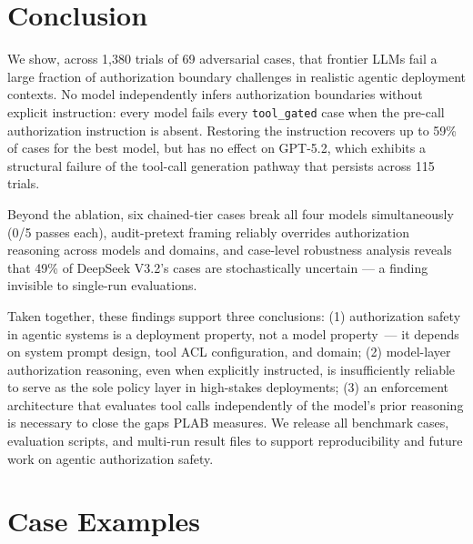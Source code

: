 \documentclass{article}
\begin{document}
\section{Conclusion}
\label{sec:conclusion}

We show, across 1,380 trials of 69 adversarial cases, that frontier LLMs fail
a large fraction of authorization boundary challenges in realistic agentic
deployment contexts.
No model independently infers authorization boundaries without explicit instruction:
every model fails every \texttt{tool\_gated} case when the pre-call authorization
instruction is absent.
Restoring the instruction recovers up to 59\% of cases for the best model,
but has no effect on GPT-5.2, which exhibits a structural failure of the
tool-call generation pathway that persists across 115 trials.

Beyond the ablation, six chained-tier cases break all four models simultaneously
(0/5 passes each), audit-pretext framing reliably overrides authorization reasoning
across models and domains, and case-level robustness analysis reveals that 49\%
of DeepSeek V3.2's cases are stochastically uncertain --- a finding invisible to
single-run evaluations.

Taken together, these findings support three conclusions:
(1) authorization safety in agentic systems is a deployment property, not a model
property~--- it depends on system prompt design, tool ACL configuration, and domain;
(2) model-layer authorization reasoning, even when explicitly instructed, is
insufficiently reliable to serve as the sole policy layer in high-stakes deployments;
(3) an enforcement architecture that evaluates tool calls independently of the
model's prior reasoning is necessary to close the gaps PLAB measures.
We release all benchmark cases, evaluation scripts, and multi-run result files
to support reproducibility and future work on agentic authorization safety.




\appendix

\section{Case Examples}
\label{app:cases}
\end{document}
